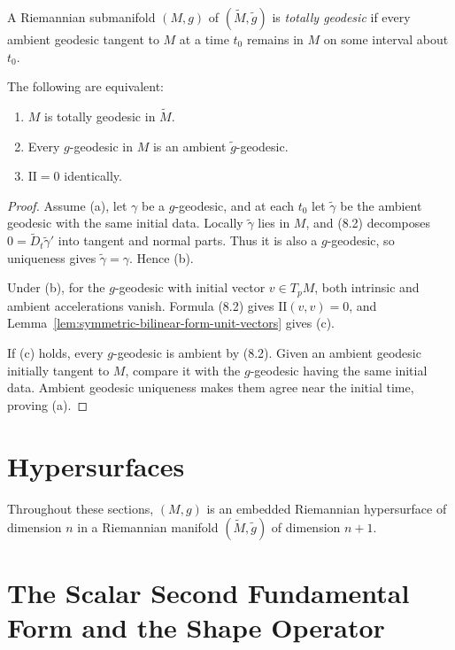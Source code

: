 A Riemannian submanifold $(M,g)$ of $(\widetilde M,\widetilde g)$ is
\emph{totally geodesic} if every ambient geodesic tangent to $M$ at a time
$t_0$ remains in $M$ on some interval about $t_0$.

\begin{proposition}
\label{prop:totally-geodesic-equivalence}


The following are equivalent:
\begin{enumerate}
\item[(a)] $M$ is totally geodesic in $\widetilde M$.
\item[(b)] Every $g$-geodesic in $M$ is an ambient
$\widetilde g$-geodesic.
\item[(c)] $\mathrm{II}=0$ identically.
\end{enumerate}
\end{proposition}

\begin{proof}
\sketch Assume (a), let $\gamma$ be a $g$-geodesic, and at each $t_0$ let
$\widetilde\gamma$ be the ambient geodesic with the same initial data.
Locally $\widetilde\gamma$ lies in $M$, and (8.2) decomposes
$0=\widetilde D_t\widetilde\gamma'$ into tangent and normal parts. Thus it is
also a $g$-geodesic, so uniqueness gives
$\widetilde\gamma=\gamma$. Hence (b).

Under (b), for the $g$-geodesic with initial vector $v\in T_pM$, both
intrinsic and ambient accelerations vanish. Formula (8.2) gives
$\mathrm{II}(v,v)=0$, and
Lemma~\ref{lem:symmetric-bilinear-form-unit-vectors} gives (c).

If (c) holds, every $g$-geodesic is ambient by (8.2). Given an ambient
geodesic initially tangent to $M$, compare it with the $g$-geodesic having
the same initial data. Ambient geodesic uniqueness makes them agree near the
initial time, proving (a).
\end{proof}
\section{Hypersurfaces}

Throughout these sections, $(M,g)$ is an embedded Riemannian hypersurface of
dimension $n$ in a Riemannian manifold $(\widetilde M,\widetilde g)$ of
dimension $n+1$.

\section{The Scalar Second Fundamental Form and the Shape Operator}

